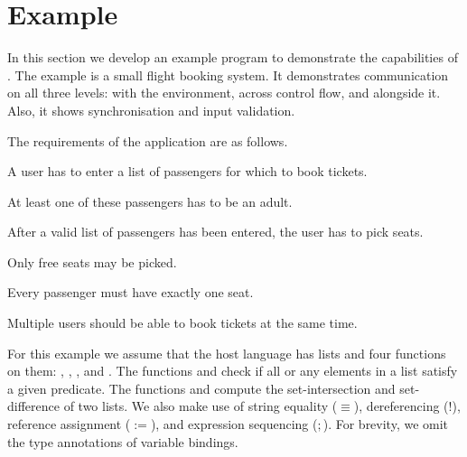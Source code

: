 


\section{Example}
\label{sec:example}

In this section we develop an example program to demonstrate the capabilities of \TOPHAT.
The example is a small flight booking system.
It demonstrates communication on all three levels: with the environment, across control flow, and alongside it.
Also, it shows synchronisation and input validation.

The requirements of the application are as follows.
\begin{enumerate*}
  \item A user has to enter a list of passengers for which to book tickets.
  \item At least one of these passengers has to be an adult.
  \item After a valid list of passengers has been entered, the user has to pick seats.
  \item Only free seats may be picked.
  \item Every passenger must have exactly one seat.
  \item Multiple users should be able to book tickets at the same time.
\end{enumerate*}

For this example we assume that the host language has lists and four functions on them: , , , and .
The functions  and  check if all or any elements in a list satisfy a given predicate.
The functions  and  compute the set-intersection and set-difference of two lists.
We also make use of string equality ($\equiv$), dereferencing ($!$), reference assignment ($:=$), and expression sequencing ($;$).
For brevity, we omit the type annotations of variable bindings.


